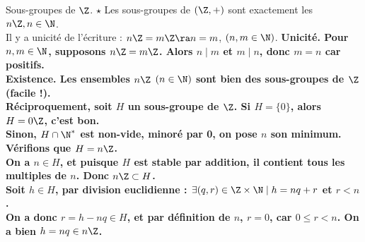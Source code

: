 \documentclass[11pt]{article}
\begin{document}
\begin{thm}{Sous-groupes de $\Z$. $\star$}{}
    Les sous-groupes de $(\Z,+)$ sont exactement les $n\Z,n\in\N$.\\
    Il y a unicité de l'écriture : $n\Z=m\Z\ra n=m$, $(n,m\in\N)$.
    \tcblower
    \bf{Unicité.} Pour $n,m\in\N$, supposons $n\Z=m\Z$. Alors $n\mid m$ et $m\mid n$, donc $m=n$ car positifs.\\
    \bf{Existence.} Les ensembles $n\Z$ $(n\in\N)$ sont bien des sous-groupes de $\Z$ (facile !).\\
    Réciproquement, soit $H$ un sous-groupe de $\Z$. Si $H=\{0\}$, alors $H=0\Z$, c'est bon.\\
    Sinon, $H\cap\N^*$ est non-vide, minoré par 0, on pose $n$ son minimum. Vérifions que $H=n\Z$.\\
    \boxed{\supset} On a $n\in H$, et puisque $H$ est stable par addition, il contient tous les multiples de $n$. Donc $n\Z\subset H$.\\
    \boxed{\subset} Soit $h\in H$, par \bf{division euclidienne} : $\exists (q,r)\in\Z\times\N \mid h = nq+r$ et $r<n$.\\
    On a donc $r=h-nq\in H$, et par définition de $n$, $r=0$, car $0\leq r<n$. On a bien $h=nq\in n\Z$.
\end{thm}

\pagebreak
\end{document}
